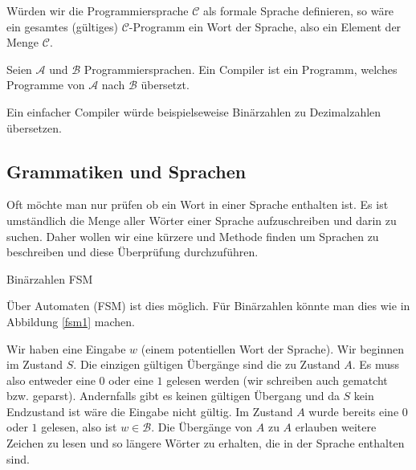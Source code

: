 Würden wir die Programmiersprache $\mathcal{C}$ als formale Sprache definieren, so wäre
ein gesamtes (gültiges) $\mathcal{C}$-Programm ein Wort der Sprache, also ein Element der Menge $\mathcal{C}$.

\begin{defn}[Compiler]
Seien $\mathcal{A}$ und $\mathcal{B}$ Programmiersprachen. Ein Compiler ist ein Programm, welches Programme von $\mathcal{A}$ nach $\mathcal{B}$ übersetzt.
\end{defn}

Ein einfacher Compiler würde beispielseweise Binärzahlen zu Dezimalzahlen übersetzen.

\subsection{Grammatiken und Sprachen}
Oft möchte man nur prüfen ob ein Wort in einer Sprache enthalten ist.
Es ist umständlich die Menge aller Wörter einer Sprache aufzuschreiben und darin zu suchen.
Daher wollen wir eine kürzere und Methode finden um Sprachen zu beschreiben und diese Überprüfung durchzuführen.

\begin{floatingfigure}[r]{6.5cm}
\begin{center}
\end{center}
 \caption{Binärzahlen FSM}
  \vspace{0.3cm}
 \label{fsm1}
\end{floatingfigure}

Über Automaten (FSM) ist dies möglich. Für Binärzahlen könnte man dies wie in Abbildung \ref{fsm1} machen.

Wir haben eine Eingabe $w$ (einem potentiellen Wort der Sprache).
Wir beginnen im Zustand $S$. Die einzigen gültigen Übergänge sind die zu Zustand $A$. Es muss also entweder eine $0$ oder
eine $1$ gelesen werden (wir schreiben auch gematcht bzw. geparst). Andernfalls gibt es keinen gültigen Übergang und da $S$ kein Endzustand ist wäre die Eingabe nicht gültig.
Im Zustand $A$ wurde bereits eine $0$ oder $1$ gelesen, also ist $w \in \mathcal{B}$. Die Übergänge von $A$ zu $A$ erlauben
weitere Zeichen zu lesen und so längere Wörter zu erhalten, die in der Sprache enthalten sind.

